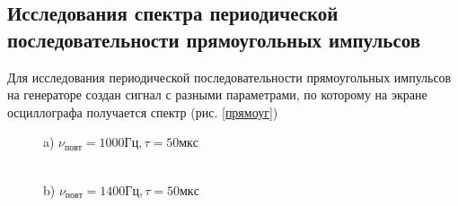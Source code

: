 \documentclass[a4paper,12pt]{article} %
\begin{document}
\subsection*{Исследования спектра периодической последовательности прямоугольных импульсов}
Для исследования периодической последовательности прямоугольных импульсов на генераторе создан сигнал с разными параметрами, по которому на экране осциллографа получается спектр (рис. \ref{прямоуг})

\begin{figure}[h!]
\begin{minipage}[h!]{0.47\linewidth}
 a) $\nu_{повт} = 1000 Гц, \tau = 50 мкс$\\
\end{minipage}
\hfill
\begin{minipage}[h!]{0.47\linewidth}
 \\b) $\nu_{повт} = 1400 Гц, \tau = 50 мкс$

\end{minipage}
\end{figure}
\end{document}
